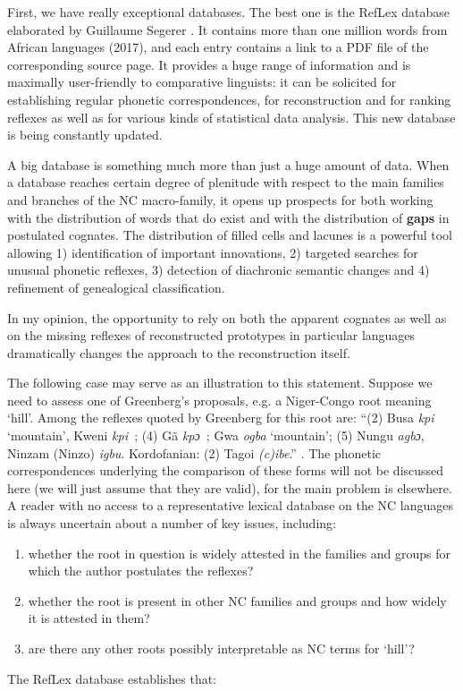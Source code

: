  
First, we have really exceptional databases. The best one is the RefLex data\-base elaborated by Guillaume Segerer \citep{RefLex}. It contains more than one million words from African languages (2017), and each entry contains a link to a PDF file of the corresponding source page. It provides a huge range of information and is maximally user-friendly to comparative linguists: it can be solicited for establishing regular phonetic correspondences, for reconstruction and for ranking reflexes as well as for various kinds of statistical data analysis. This new database is being constantly updated. 

A big database is something much more than just a huge amount of data. When a database  reaches certain degree of plenitude with respect to the main families and branches of the NC macro-family, it opens up prospects for both working with the distribution of words that do exist and with the distribution of \textbf{gaps} in postulated cognates. The distribution of filled cells and lacunes is a powerful tool allowing 1) identification of important innovations, 2) targeted searches for unusual phonetic reflexes, 3) detection of diachronic semantic changes and 4) refinement of genealogical classification.

In my opinion, the opportunity to rely on both the apparent cognates as well as on the missing reflexes of reconstructed prototypes in particular languages dramatically changes the approach to the reconstruction itself.

The following case may serve as an illustration to this statement. Suppose we need to assess one of Greenberg’s proposals, e.g. a Niger-Congo root meaning ‘hill’. Among the reflexes quoted by Greenberg for this root are: “(2) Busa \textit{kpi} ‘mountain’, Kweni  \textit{kpi~}; (4) Gã \textit{kpɔ~}; Gwa \textit{ogba} ‘mountain’; (5) Nungu \textit{agbɔ}, Ninzam (Ninzo) \textit{igbu}. Kordofanian: (2) Tagoi \textit{(c)ibe}.” \citep[155]{Greenberg1966}. The phonetic correspondences underlying the comparison of these forms will not be discussed here (we will just assume that they are valid), for the main problem is elsewhere. A reader with no access to a representative lexical database on the NC languages is always uncertain about a number of key issues, including:

\begin{enumerate}
\item whether the root in question is widely attested in the families and groups for which the author postulates the reflexes?
\item whether the root is present in other NC families and groups and how widely it is attested in them?
\item are there any other roots possibly interpretable as NC terms for ‘hill’?
\end{enumerate}
The RefLex database establishes  that: 

